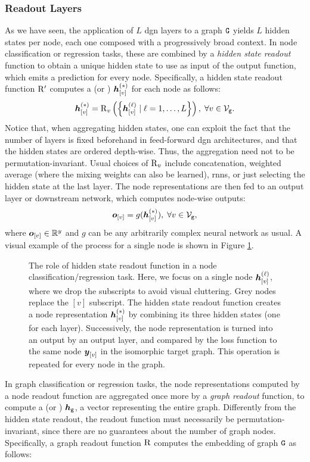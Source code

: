 \subsubsection*{Readout Layers}
As we have seen, the application of $L$ \gls{dgn} layers to a graph $\AttrGraph{G}$ yields $L$ hidden states per node, each one composed with a progressively broad context. In node classification or regression tasks, these are combined by a \emph{hidden state readout} function to obtain a unique hidden state to use as input of the output function, which emits a prediction for every node. Specifically, a hidden state readout function $\mathrm{R'}$ computes a  (or ) $\StateVector{v}{*}$ for each node as follows:
$$\StateVector{v}{*} = \Op{R}_{v}\Par{\Set{\StateVector{v}{\ell} \mid \ell = 1, \ldots, L}},\;  \forall v \in \Nodes{g}. $$
Notice that, when aggregating hidden states, one can exploit the fact that the number of layers is fixed beforehand in feed-forward \gls{dgn} architectures, and that the hidden states are ordered depth-wise. Thus, the aggregation need not to be permutation-invariant. Usual choices of $\operatorname{R}_{v}$ include concatenation, weighted average (where the mixing weights can also be learned), \gls{rnn}s, or just selecting the hidden state at the last layer. The node representations are then fed to an output layer or downstream network, which computes node-wise outputs:
$$\Elem{o}{v} = g(\StateVector{v}{*}),\; \forall v \in \Nodes{g},$$
where $\Elem{o}{v} \in \Real^y$ and $g$ can be any arbitrarily complex neural network as usual. A visual example of the process for a single node is shown in Figure \ref{fig:node-readout}.
\begin{figure*}[h!]
    \centering
    \resizebox{.8\textwidth}{!}{}
    \caption{The role of hidden state readout function in a node classification/regression task. Here, we focus on a single node $\StateVector{v}{\ell}$, where we drop the subscripts to avoid visual cluttering. Grey nodes replace the $[v]$ subscript. The hidden state readout function creates a node representation $\StateVector{v}{*}$ by combining its three hidden states (one for each layer). Successively, the node representation is turned into an output by an output layer, and compared by the loss function to the same node $\Elem{y}{v}$ in the isomorphic target graph. This operation is repeated for every node in the graph.}
    \label{fig:node-readout}
\end{figure*}
In graph classification or regression tasks, the node representations computed by a node readout function are aggregated once more by a \emph{graph readout} function, to compute a  (or ) $\GraphRepr{g}$, \ie a vector representing the entire graph. Differently from the hidden state readout, the readout function must necessarily be permutation-invariant, since there are no guarantees about the number of graph nodes. Specifically, a graph readout function $\mathrm{R}$ computes the embedding of graph $\AttrGraph{g}$ as follows:
